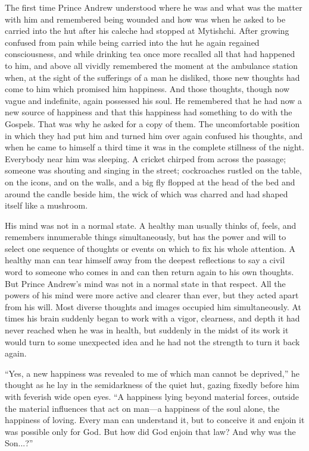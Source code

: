 The first time Prince Andrew understood where he was and what was
the matter with him and remembered being wounded and how was when
he asked to be carried into the hut after his caleche had stopped
at Mytishchi.  After growing confused from pain while being
carried into the hut he again regained consciousness, and while
drinking tea once more recalled all that had happened to him, and
above all vividly remembered the moment at the ambulance station
when, at the sight of the sufferings of a man he disliked, those
new thoughts had come to him which promised him happiness. And
those thoughts, though now vague and indefinite, again possessed
his soul. He remembered that he had now a new source of happiness
and that this happiness had something to do with the Gospels.
That was why he asked for a copy of them. The uncomfortable
position in which they had put him and turned him over again
confused his thoughts, and when he came to himself a third time
it was in the complete stillness of the night. Everybody near him
was sleeping. A cricket chirped from across the passage; someone
was shouting and singing in the street; cockroaches rustled on
the table, on the icons, and on the walls, and a big fly flopped
at the head of the bed and around the candle beside him, the wick
of which was charred and had shaped itself like a mushroom.

His mind was not in a normal state. A healthy man usually thinks
of, feels, and remembers innumerable things simultaneously, but
has the power and will to select one sequence of thoughts or
events on which to fix his whole attention. A healthy man can
tear himself away from the deepest reflections to say a civil
word to someone who comes in and can then return again to his own
thoughts. But Prince Andrew's mind was not in a normal state in
that respect. All the powers of his mind were more active and
clearer than ever, but they acted apart from his will. Most
diverse thoughts and images occupied him simultaneously. At times
his brain suddenly began to work with a vigor, clearness, and
depth it had never reached when he was in health, but suddenly in
the midst of its work it would turn to some unexpected idea and
he had not the strength to turn it back again.

``Yes, a new happiness was revealed to me of which man cannot be
deprived,'' he thought as he lay in the semidarkness of the quiet
hut, gazing fixedly before him with feverish wide open eyes. ``A
happiness lying beyond material forces, outside the material
influences that act on man---a happiness of the soul alone, the
happiness of loving. Every man can understand it, but to conceive
it and enjoin it was possible only for God. But how did God
enjoin that law? And why was the Son...?''

